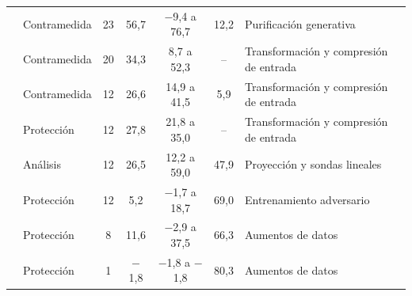 \begin{footnotesize}
\begin{longtable}{@{}lL{1.7cm}cccc L{3.2cm}@{}}
\cite{S0079} & Contramedida & 23 & 56,7 & $-$9,4 a 76,7 & 12,2 & Purificación generativa \\
\cite{S0043} & Contramedida & 20 & 34,3 & 8,7 a 52,3 & -- & Transformación y compresión de entrada \\
\cite{S0007} & Contramedida & 12 & 26,6 & 14,9 a 41,5 & 5,9 & Transformación y compresión de entrada \\
\cite{S0107} & Protección & 12 & 27,8 & 21,8 a 35,0 & -- & Transformación y compresión de entrada \\
\cite{S0123} & Análisis & 12 & 26,5 & 12,2 a 59,0 & 47,9 & Proyección y sondas lineales \\
\cite{S0126} & Protección & 12 & 5,2 & $-$1,7 a 18,7 & 69,0 & Entrenamiento adversario \\
\cite{S0137} & Protección & 8 & 11,6 & $-$2,9 a 37,5 & 66,3 & Aumentos de datos \\
\cite{S0014} & Protección & 1 & $-$1,8 & $-$1,8 a $-$1,8 & 80,3 & Aumentos de datos \\
\end{longtable}
\end{footnotesize}

